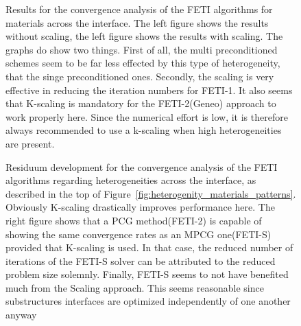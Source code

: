 \begin{figure}[tb]
  \begin{center}
    
    \caption[Study of heterogeneities across the interface: \# iterations]{Results for the convergence analysis of the FETI algorithms for materials across the interface. The left figure shows the results without scaling, the left figure shows the results with scaling. The graphs do show two things. First of all, the multi preconditioned schemes seem to be far less effected by this type of heterogeneity, that the singe preconditioned ones.  Secondly, the scaling is very effective in reducing the iteration numbers for FETI-1. It also seems that K-scaling is mandatory for the FETI-2(Geneo) approach to work properly here. Since the numerical effort is low, it is therefore always recommended to use a k-scaling when high heterogeneities are present.}
    \label{fig:study_heterogeneity_results_across}
  \end{center}
\end{figure}

\begin{figure}
  \begin{center}
    
    \caption[Study of heterogeneities across the interface: residua]{Residuum development for the convergence analysis of the FETI algorithms regarding heterogeneities across the interface, as described in the top of Figure~\ref{fig:heterogenity_materials_patterns}. Obviously K-scaling drastically improves performance here. The right figure shows that a PCG method(FETI-2) is capable of showing the same convergence rates as an MPCG one(FETI-S) provided that K-scaling is used. In that case, the reduced number of iterations of the FETI-S solver can be attributed to the reduced problem size solemnly. Finally, FETI-S seems to not have benefited much from the Scaling approach. This seems reasonable since substructures interfaces are optimized independently of one another anyway}
    \label{fig:heterogeneity_accross_residuum}
  \end{center}
\end{figure}

